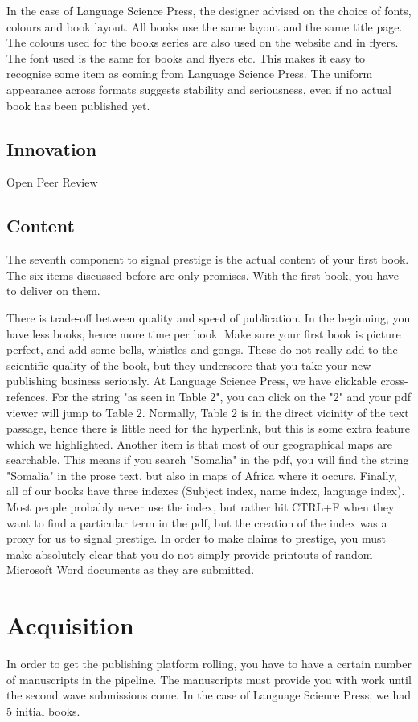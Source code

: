\documentclass[guidelines,nonflat,modfonts] {langsci/langscibook}
\begin{document}
In the case of Language Science Press, the designer advised on the choice of fonts, colours and book layout. All books use the same layout and the same title page. The colours used for the books series are also used on the website and in flyers. The font used is the same for books and flyers etc. This makes it easy to recognise some item as coming from Language Science Press. The uniform appearance across formats suggests stability and seriousness, even if no actual book has been published yet. 

\subsection{Innovation}
Open Peer Review%

\subsection{Content}
The seventh component to signal prestige is the actual content of your first book. The six items discussed before are only promises. With the first book, you have to deliver on them. 

There is trade-off between quality and speed of publication. In the beginning, you have less books, hence more time per book. Make sure your first book is picture perfect, and add some bells, whistles and gongs. These do not really add to the scientific quality of the book, but they underscore that you take your new publishing business seriously. At Language Science Press, we have clickable cross-refences. For the string "as seen in Table 2", you can click on the "2" and your pdf viewer will jump to Table 2. Normally, Table 2 is in the direct vicinity of the text passage, hence there is little need for the hyperlink, but this is some extra feature which we highlighted. Another item is that most of our geographical maps are searchable. This means if you search "Somalia" in the pdf, you will find the string "Somalia" in the prose text, but also in maps of Africa where it occurs. Finally, all of our books have three indexes (Subject index, name index, language index). Most people probably never use the index, but rather hit CTRL+F when they want to find a particular term in the pdf, but the creation of the index was a proxy for us to signal prestige. In order to make claims to prestige, you must make absolutely clear that you do not simply provide printouts of random Microsoft Word documents as they are submitted. 


\section{Acquisition}
In order to get the publishing platform rolling, you have to have a certain number of manuscripts in the pipeline. The manuscripts must provide you with work until the second wave submissions come. In the case of Language Science Press, we had 5%
 initial books. 
\end{document}
